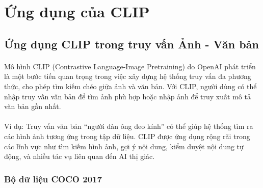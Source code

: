 \newpage
\section{Ứng dụng của CLIP}
\subsection{Ứng dụng CLIP trong truy vấn Ảnh - Văn bản}

\paragraph{}{Mô hình CLIP (Contrastive Language-Image Pretraining) do OpenAI phát triển là một bước tiến quan trọng trong việc xây dựng hệ thống truy vấn đa phương thức, cho phép tìm kiếm chéo giữa ảnh và văn bản. Với CLIP, người dùng có thể nhập truy vấn văn bản để tìm ảnh phù hợp hoặc nhập ảnh để truy xuất mô tả văn bản gần nhất.}

\paragraph{}{Ví dụ: Truy vấn văn bản “người đàn ông đeo kính” có thể giúp hệ thống tìm ra các hình ảnh tương ứng trong tập dữ liệu. CLIP được ứng dụng rộng rãi trong các lĩnh vực như tìm kiếm hình ảnh, gợi ý nội dung, kiểm duyệt nội dung tự động, và nhiều tác vụ liên quan đến AI thị giác.
}

\subsubsection{Bộ dữ liệu COCO 2017}
